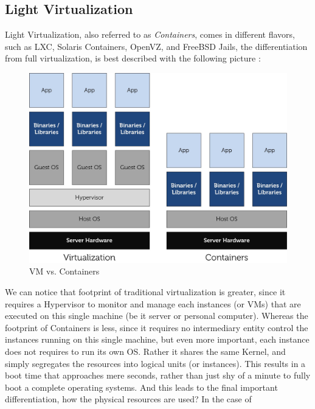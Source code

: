 \documentclass[11pt]{amsart}
\begin{document}
\begin{enumarate}
        \subsection{Light Virtualization}
        Light Virtualization, also referred to as \emph{Containers}, comes in different
        flavors, such as LXC, Solaris Containers, OpenVZ, and FreeBSD Jails, the
        differentiation from full virtualization, is best described with the following
        picture \cite{dell}:
        \begin{center}
                \begin{figure}[h]
                        \includegraphics[width=125mm]{lxc-vm.jpg}
                        \caption{VM vs. Containers\label{vm_containers}}
                \end{figure}
        \end{center}
        We can notice that footprint of traditional virtualization is greater, since it
        requires a Hypervisor to monitor and manage each instances (or VMs) that are
        executed on this single machine (be it server or personal computer). Whereas the
        footprint of Containers is less, since it requires no intermediary entity control
        the instances running on this single machine, but even more important, each
        instance does not requires to run its own OS. Rather it shares the same Kernel,
        and simply segregates the resources into logical units (or instances). This
        results in a boot time that approaches mere seconds, rather than just shy of a
        minute to fully boot a complete operating systems. And this leads to the final
        important differentiation, how the physical resources are used? In the case of

\end{enumarate}
\end{document}
